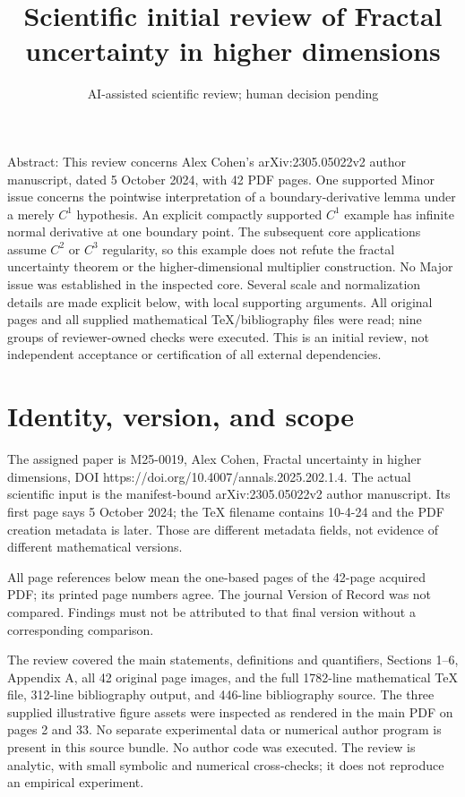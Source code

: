 \documentclass[10pt]{article}
\title{Scientific initial review of
Fractal uncertainty in higher dimensions}
\author{AI-assisted scientific review; human decision pending}
\date{}
\begin{document}
\maketitle
Abstract: This review concerns Alex Cohen’s arXiv:2305.05022v2 author manuscript, dated 5 October 2024, with 42 PDF pages. One supported Minor issue concerns the pointwise interpretation of a boundary-derivative lemma under a merely \(C^1\) hypothesis. An explicit compactly supported \(C^1\) example has infinite normal derivative at one boundary point. The subsequent core applications assume \(C^2\) or \(C^3\) regularity, so this example does not refute the fractal uncertainty theorem or the higher-dimensional multiplier construction. No Major issue was established in the inspected core. Several scale and normalization details are made explicit below, with local supporting arguments. All original pages and all supplied mathematical TeX/bibliography files were read; nine groups of reviewer-owned checks were executed. This is an initial review, not independent acceptance or certification of all external dependencies.\par
\section*{Identity, version, and scope}
The assigned paper is M25-0019, Alex Cohen, Fractal uncertainty in higher dimensions, DOI https://doi.org/10.4007/annals.2025.202.1.4. The actual scientific input is the manifest-bound arXiv:2305.05022v2 author manuscript. Its first page says 5 October 2024; the TeX filename contains 10-4-24 and the PDF creation metadata is later. Those are different metadata fields, not evidence of different mathematical versions.\par
All page references below mean the one-based pages of the 42-page acquired PDF; its printed page numbers agree. The journal Version of Record was not compared. Findings must not be attributed to that final version without a corresponding comparison.\par
The review covered the main statements, definitions and quantifiers, Sections 1–6, Appendix A, all 42 original page images, and the full 1782-line mathematical TeX file, 312-line bibliography output, and 446-line bibliography source. The three supplied illustrative figure assets were inspected as rendered in the main PDF on pages 2 and 33. No separate experimental data or numerical author program is present in this source bundle. No author code was executed. The review is analytic, with small symbolic and numerical cross-checks; it does not reproduce an empirical experiment.\par
\end{document}
